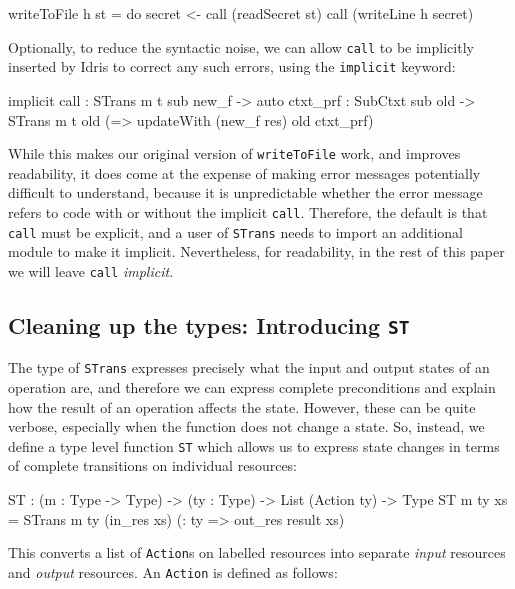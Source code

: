\small
\begin{code}
writeToFile h st = do secret <- call (readSecret st)
                      call (writeLine h secret)
\end{code}
\normalsize

Optionally, to reduce the syntactic noise, we can allow \texttt{call}
to be implicitly inserted by Idris to correct any such errors, using
the \texttt{implicit} keyword:

\small
\begin{code}
implicit call : STrans m t sub new_f -> {auto ctxt_prf : SubCtxt sub old} ->
                STrans m t old (\res => updateWith (new_f res) old ctxt_prf)
\end{code}
\normalsize

While this makes our original version of \texttt{writeToFile} work, and
improves readability, it does come at the expense of making error messages
potentially difficult to understand, because it is unpredictable whether the
error message refers to code with or without the implicit \texttt{call}.
Therefore, the default is that \texttt{call} must be explicit, and
a user of \texttt{STrans} needs to import an additional module to
make it implicit. Nevertheless, for readability, in the rest of this paper we
will leave \texttt{call} \emph{implicit}.

\subsection{Cleaning up the types: Introducing \texttt{ST}}

\label{sect:sttype}

The type of \texttt{STrans} expresses precisely what the input and output
states of an operation are, and therefore we can express complete preconditions
and explain how the result of an operation affects the state. However, these
can be quite verbose, especially when the function does not change a state.
So, instead, we define a type level function
\texttt{ST} which allows us to express state changes in terms of 
complete transitions on individual resources:

\small
\begin{code}
ST : (m : Type -> Type) -> (ty : Type) -> List (Action ty) -> Type
ST m ty xs = STrans m ty (in_res xs) (\result : ty => out_res result xs)
\end{code}
\normalsize

This converts a list of \texttt{Action}s on labelled resources
into separate \emph{input} resources and \emph{output} resources. An
\texttt{Action} is defined as follows:

